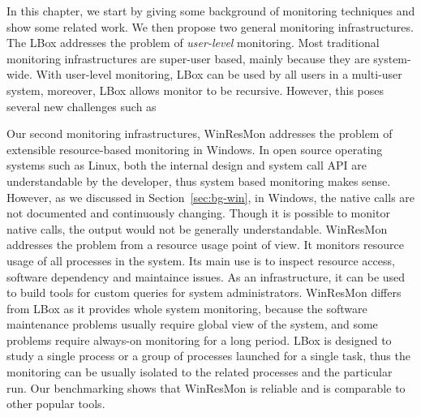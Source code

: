 In this chapter, we start by giving some background of monitoring techniques
and show some related work.
We then propose two general monitoring infrastructures.
The LBox addresses the problem of {\em user-level} monitoring.
Most traditional monitoring infrastructures are super-user based,
mainly because they are system-wide.
With user-level monitoring, LBox can be used by all users in a multi-user
system, moreover, LBox allows monitor to be recursive.
However, this poses several new challenges such as

Our second monitoring infrastructures, WinResMon addresses the problem
of extensible resource-based monitoring in Windows.
In open source operating systems such as Linux,
both the internal design and system call API are understandable by
the developer, thus system based monitoring makes sense.
However, as we discussed in Section~\ref{sec:bg-win},
in Windows, the native calls are not documented and continuously
changing.
Though it is possible to monitor native calls, the output would not be
generally understandable.
WinResMon addresses the problem from a resource usage point of view.
It monitors resource usage of all processes in the system.
Its main use is to inspect resource access, software dependency and
maintaince issues.
As an infrastructure, it can be used to build tools for custom queries
for system administrators.
WinResMon differs from LBox as it provides whole system monitoring,
because the software maintenance problems usually require global view
of the system,
and some problems require always-on monitoring for a long period.
LBox is designed to study a single process or a group of processes launched
for a single task, thus
the monitoring can be usually isolated to the related processes and
the particular run.
Our benchmarking shows that WinResMon is reliable and is
comparable to other popular tools.
